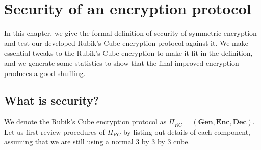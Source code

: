 \chapter{Security of an encryption protocol}\label{chap:security}
In this chapter, we give the formal definition of security of symmetric encryption and test our developed Rubik's Cube encryption protocol against it. We make essential tweaks to the Rubik's Cube encryption to make it fit in the definition, and we generate some statistics to show that the final improved encryption produces a good shuffling.

\section{What is security?}
We denote the Rubik's Cube encryption protocol as $\Pi_{RC} = (\textbf{Gen}, \textbf{Enc}, \textbf{Dec})$. Let us first review procedures of $\Pi_{RC}$ by listing out details of each component, assuming that we are still using a normal 3 by 3 by 3 cube.
